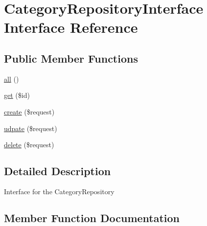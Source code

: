 \hypertarget{interface_app_1_1_repositories_1_1_product_1_1_category_repository_interface}{}\section{Category\+Repository\+Interface Interface Reference}
\label{interface_app_1_1_repositories_1_1_product_1_1_category_repository_interface}
\subsection*{Public Member Functions}
\begin{DoxyCompactItemize}
\item 
\mbox{\hyperlink{interface_app_1_1_repositories_1_1_product_1_1_category_repository_interface_af9d14e4ae6227970ad603987781573ca}{all}} ()
\item 
\mbox{\hyperlink{interface_app_1_1_repositories_1_1_product_1_1_category_repository_interface_a50e3bfb586b2f42932a6a93f3fbb0828}{get}} (\$id)
\item 
\mbox{\hyperlink{interface_app_1_1_repositories_1_1_product_1_1_category_repository_interface_a4fa811c83f27da01b0d92bdb2a711a13}{create}} (\$request)
\item 
\mbox{\hyperlink{interface_app_1_1_repositories_1_1_product_1_1_category_repository_interface_a2aedea52c52e54ba3c4c9f60423e7ef1}{udpate}} (\$request)
\item 
\mbox{\hyperlink{interface_app_1_1_repositories_1_1_product_1_1_category_repository_interface_a126a3799c44d72393ca4732081306dfd}{delete}} (\$request)
\end{DoxyCompactItemize}


\subsection{Detailed Description}
Interface for the Category\+Repository 

\subsection{Member Function Documentation}
\mbox{\label{interface_app_1_1_repositories_1_1_product_1_1_category_repository_interface_af9d14e4ae6227970ad603987781573ca}} 
